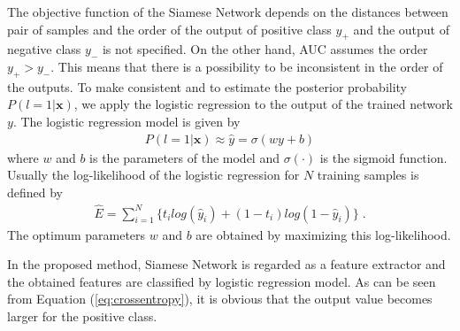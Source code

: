 \documentclass[twocolumn,10pt]{article}
\begin{document}
The objective function of the Siamese Network depends on the distances between pair of samples and the order of the output of positive class $y_+$ and the output of negative class $y_-$ is not specified.
On the other hand, AUC assumes the order $y_+ > y_-$.
This means that there is a possibility to be inconsistent in the order of the outputs.
To make consistent and to estimate the posterior probability $P(l=1|\bm{x})$, we apply the logistic regression to the output of the trained network $y$. 
The logistic regression model is given by
\begin{align} \label{eq:regression}
    P(l=1|\bm{x}) \approx \hat{y} = \sigma(w y+b)
\end{align}
where $w$ and $b$ is the parameters of the model and $\sigma(\cdot)$ is the sigmoid function.
Usually the log-likelihood of the logistic regression for $N$ training samples is defined by
\begin{align} \label{eq:crossentropy}
    \hat{E} = \sum_{i=1}^N \{ t_i log(\hat{y}_i) + (1-t_i) log(1-\hat{y}_i) \} \; .
\end{align}
The optimum parameters $w$ and $b$ are obtained by maximizing this log-likelihood.


In the proposed method, Siamese Network is regarded as a feature extractor and the obtained features are classified by logistic regression model.
As can be seen from Equation (\ref{eq:crossentropy}), it is obvious that the output value becomes larger for the positive class.
\end{document}
